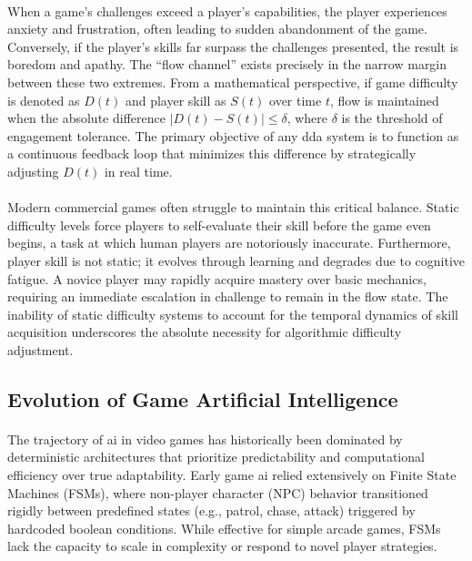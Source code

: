 \paragraph{} When a game's challenges exceed a player's capabilities, the player experiences anxiety and frustration, often leading to sudden abandonment of the game. Conversely, if the player's skills far surpass the challenges presented, the result is boredom and apathy. The ``flow channel'' exists precisely in the narrow margin between these two extremes. From a mathematical perspective, if game difficulty is denoted as $D(t)$ and player skill as $S(t)$ over time $t$, flow is maintained when the absolute difference $|D(t) - S(t)| \le \delta$, where $\delta$ is the threshold of engagement tolerance. The primary objective of any \ac{dda} system is to function as a continuous feedback loop that minimizes this difference by strategically adjusting $D(t)$ in real time. 
\paragraph{} Modern commercial games often struggle to maintain this critical balance. Static difficulty levels force players to self-evaluate their skill before the game even begins, a task at which human players are notoriously inaccurate. Furthermore, player skill is not static; it evolves through learning and degrades due to cognitive fatigue. A novice player may rapidly acquire mastery over basic mechanics, requiring an immediate escalation in challenge to remain in the flow state. The inability of static difficulty systems to account for the temporal dynamics of skill acquisition underscores the absolute necessity for algorithmic difficulty adjustment.

\subsection{Evolution of Game Artificial Intelligence}
\paragraph{} The trajectory of \ac{ai} in video games has historically been dominated by deterministic architectures that prioritize predictability and computational efficiency over true adaptability. Early game \ac{ai} relied extensively on Finite State Machines (FSMs), where non-player character (NPC) behavior transitioned rigidly between predefined states (e.g., patrol, chase, attack) triggered by hardcoded boolean conditions. While effective for simple arcade games, FSMs lack the capacity to scale in complexity or respond to novel player strategies.
